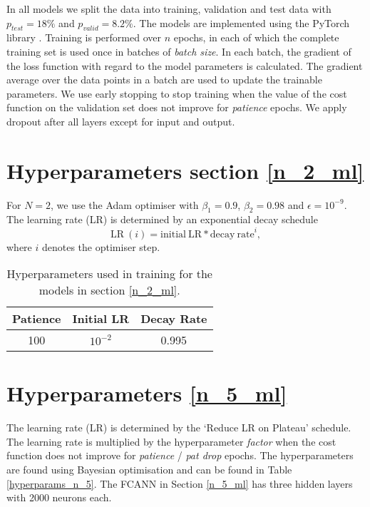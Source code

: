 In all models we split the data into training, validation and test data with $p_{test} = 18 \%$ and $p_{valid} = 8.2 \%$. 
The models are implemented using the PyTorch library \cite{NEURIPS2019_9015}. 
Training is performed over $n$ epochs, in each of which the complete training set is used once in batches of \textit{batch size}.
In each batch, the gradient of the loss function with regard to the model parameters is calculated.
The gradient average over the data points in a batch are used to update the trainable parameters.
We use early stopping to stop training when the value of the cost function on the validation set does not improve for \textit{patience} epochs.
We apply dropout \cite{hinton2012improving} after all layers except for input and output.

\section{Hyperparameters section \ref{n_2_ml}}
For $N=2$, we use the Adam optimiser with $\beta_1 = 0.9$, $\beta_2 = 0.98$ and $\epsilon = 10^{-9}$. The learning rate (LR) is determined by an exponential decay schedule
\begin{equation} \label{eds}
\mathrm{LR} \ (i) = \mathrm{initial \ LR} * \mathrm{decay \ rate}^i,
\end{equation}
where $i$ denotes the optimiser step.


\begin{table}[h]
	\centering
	\begin{tabular}{c | c | c }
		Patience & Initial LR & Decay Rate \\
		\hline
		100 & $10^{-2}$ & 0.995 \\
	\end{tabular}
	\caption{Hyperparameters used in training for the models in section \ref{n_2_ml}.}
	\label{hyperparams_n_2}
\end{table}

\section{Hyperparameters \ref{n_5_ml}}
The learning rate (LR) is determined by the `Reduce LR on Plateau' schedule.
The learning rate is multiplied by the hyperparameter \textit{factor} when the cost function does not improve for \textit{patience} / \textit{pat drop} epochs.
The hyperparameters are found using Bayesian optimisation and can be found in Table \ref{hyperparams_n_5}.
The FCANN in Section \ref{n_5_ml} has three hidden layers with 2000 neurons each.

